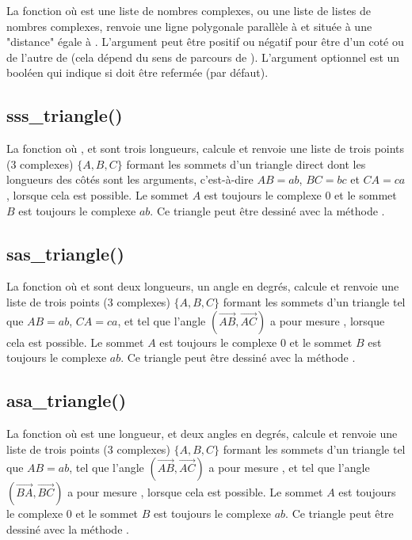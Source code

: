 La fonction  où  est une liste de nombres complexes, ou une liste de listes de nombres complexes, renvoie une ligne polygonale parallèle à  et située à une "distance" égale à . L'argument  peut être positif ou négatif pour être d'un coté ou de l'autre de  (cela dépend du sens de parcours de ). L'argument optionnel  est un booléen qui indique si  doit être refermée (\false par défaut).


\subsection{sss\_triangle()}

La fonction  où ,  et  sont trois longueurs, calcule et renvoie une liste de trois points (3 complexes) $\{A,B,C\}$ formant les sommets d'un triangle direct dont les longueurs des côtés sont les arguments, c'est-à-dire $AB=ab$, $BC=bc$ et $CA=ca$, lorsque cela est possible. Le sommet $A$ est toujours le complexe $0$ et le sommet $B$ est toujours le complexe $ab$. Ce triangle peut être dessiné avec la méthode .

\subsection{sas\_triangle()}

La fonction  où  et  sont deux longueurs,  un angle en degrés, calcule et renvoie une liste de trois points (3 complexes) $\{A,B,C\}$ formant les sommets d'un triangle tel que $AB=ab$, $CA=ca$, et tel que l'angle $(\vec{AB},\vec{AC})$ a pour mesure , lorsque cela est possible. Le sommet $A$ est toujours le complexe $0$ et le sommet $B$ est toujours le complexe $ab$. Ce triangle peut être dessiné avec la méthode .

\subsection{asa\_triangle()}

La fonction  où  est une longueur,  et  deux angles en degrés, calcule et renvoie une liste de trois points (3 complexes) $\{A,B,C\}$ formant les sommets d'un triangle tel que $AB=ab$, tel que l'angle $(\vec{AB},\vec{AC})$ a pour mesure , et tel que l'angle $(\vec{BA},\vec{BC})$ a pour mesure , lorsque cela est possible. Le sommet $A$ est toujours le complexe $0$ et le sommet $B$ est toujours le complexe $ab$. Ce triangle peut être dessiné avec la méthode .


